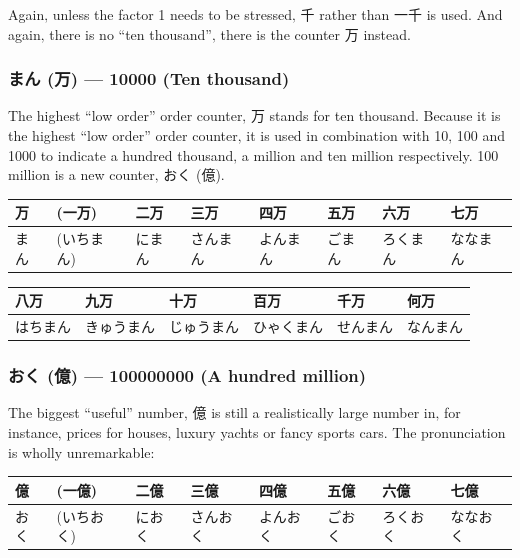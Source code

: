 \documentclass[11pt, b5paper, twoside, openright, onecolumn]{book}
\makeatletter
\newcommand*{\rubystack}[2]{{\relscale{0.5}%
  \begin{tabular}[b]{@{}c@{}}%
    {#1}\\%
   {\textscale{2}{#2}}%
  \end{tabular}}%
}
\DeclareRobustCommand*{\ruby}[2]{%
  \mbox{%
    \setlength{\parskip}{0ex}%
    \BeginAccSupp{method=pdfstringdef,ActualText={#1}}%
      \rubystack{\phantom{#2}}{#1}%
      \llap{%
        \rubystack{#2}{\phantom{#1}}%
      }%
    \EndAccSupp{}%
  }%
}
\renewcommand*{\ruby}[2]{#2 (#1)}%
\newenvironment{mytabular}[1]{\noindent\hspace{0.4in}
\begin{tabular}[h]{#1}}{\end{tabular}}
\makeatother
\begin{document}
Again‚ unless the factor 1 needs to be stressed‚ 千 rather than 一千 is used. And again‚ there is no “ten thousand”‚ there is the counter 万 instead.

\subsubsection{\ruby{万}{まん} — 10000 (Ten thousand)}

The highest “low order” order counter‚ 万 stands for ten thousand. Because it is the highest “low order” order counter‚ it is used in combination with 10‚ 100 and 1000 to indicate a hundred thousand‚ a million and ten million respectively. 100 million is a new counter‚ \ruby{億}{おく}.

\vspace{0.5cm}
\smaller
\begin{mytabular}{| l  l  l  l  l  l  l  l |}\hline 
\rule{0pt}{2.4ex}万 & (一万) & 二万 & 三万 & 四万 & 五万 & 六万 & 七万\\ 
\hline
\rule{0pt}{2.4ex}まん & (いちまん) & にまん & さんまん & よんまん & ごまん & ろくまん & ななまん\\ 
\hline 
\end{mytabular}
\larger
\vspace{0.5cm}

\smaller
\begin{mytabular}{| l  l  l  l  l  l |}\hline 
\rule{0pt}{2.4ex}八万 & 九万 & 十万 & 百万 & 千万 & 何万\\ 
\hline
\rule{0pt}{2.4ex}はちまん & きゅうまん & じゅうまん & ひゃくまん & せんまん & なんまん\\ 
\hline 
\end{mytabular}
\larger
\subsubsection{\ruby{億}{おく} — 100000000 (A hundred million)}


The biggest “useful” number‚ 億 is still a realistically large number in‚ for instance‚ prices for houses‚ luxury yachts or fancy sports cars. The pronunciation is wholly unremarkable:

\vspace{0.5cm}
\smaller
\begin{mytabular}{| l  l  l  l  l  l  l  l |}\hline 
\rule{0pt}{2.4ex}億 & (一億) & 二億 & 三億 & 四億 & 五億 & 六億 & 七億\\ 
\hline
\rule{0pt}{2.4ex}おく & (いちおく) & におく & さんおく & よんおく & ごおく & ろくおく & ななおく\\ 
\hline 
\end{mytabular}
\larger
\vspace{0.5cm}
\end{document}
